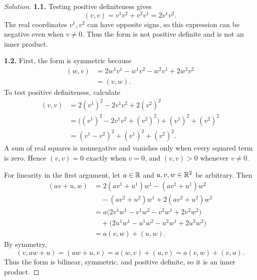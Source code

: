 \begin{proof}[Solution]
  \textbf{1.1.} Testing positive definiteness gives
  \[
    (v,v)=v^1v^2+v^2v^1=2v^1v^2.
  \]
  The real coordinates \(v^1,v^2\) can have opposite signs, so this
  expression can be negative even when \(v\ne0\). Thus the form is
  not positive definite and is not an inner product.

  \textbf{1.2.} First, the form is symmetric because
  \[
    \begin{aligned}
      (w,v)&=2w^1v^1-w^1v^2-w^2v^1+2w^2v^2\\
        &=(v,w).
    \end{aligned}
  \]
  To test positive definiteness, calculate
  \[
    \begin{aligned}
      (v,v)&=2(v^1)^2-2v^1v^2+2(v^2)^2\\
        &=\bigl((v^1)^2-2v^1v^2+(v^2)^2\bigr)
          +(v^1)^2+(v^2)^2\\
        &=(v^1-v^2)^2+(v^1)^2+(v^2)^2.
    \end{aligned}
  \]
  A sum of real squares is nonnegative and vanishes only when every
  squared term is zero. Hence \((v,v)=0\) exactly when \(v=0\), and
  \((v,v)>0\) whenever \(v\ne0\).

  For linearity in the first argument, let \(a\in\mathbb{R}\) and
  \(u,v,w\in\mathbb{R}^2\) be arbitrary. Then
  \[
    \begin{aligned}
      (av+u,w)
        &=2(av^1+u^1)w^1-(av^1+u^1)w^2\\
        &\quad -(av^2+u^2)w^1+2(av^2+u^2)w^2\\
        &=a\bigl(2v^1w^1-v^1w^2-v^2w^1+2v^2w^2\bigr)\\
        &\quad +\bigl(2u^1w^1-u^1w^2-u^2w^1+2u^2w^2\bigr)\\
        &=a(v,w)+(u,w).
    \end{aligned}
  \]
  By symmetry,
  \[
    (v,aw+u)=(aw+u,v)=a(w,v)+(u,v)=a(v,w)+(v,u).
  \]
  Thus the form is bilinear, symmetric, and positive definite, so it
  is an inner product.
\end{proof}
